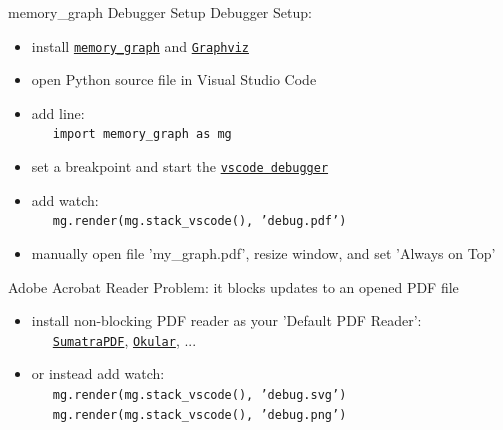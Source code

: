 \documentclass[10pt, colorlinks=true, urlcolor=blue]{beamer}
\begin{document}
\begin{frame}{memory\_graph Debugger Setup}
  \vspace{-1em}
  Debugger Setup:
  \begin{itemize}
  \item install \href{https://pypi.org/project/memory-graph/}{\texttt{memory\_graph}} and \href{https://graphviz.org/download/}{\texttt{Graphviz}}
  \item open Python source file in Visual Studio Code
  \item add line: \\ \ \ \ {\footnotesize \texttt{import memory_graph as mg}}
  \item set a breakpoint and start the \href{https://code.visualstudio.com/docs/python/debugging}{\texttt{vscode debugger}}
  \item add watch: \\ \ \ \ {\footnotesize \texttt{mg.render(mg.stack_vscode(), 'debug.pdf')}}
  \item manually open file 'my\_graph.pdf', resize window,  and set 'Always on Top'
  \end{itemize}
  
  \vspace{1.8em}
  
  Adobe Acrobat Reader Problem: it blocks updates to an opened PDF file
  \begin{itemize}
  \item install non-blocking PDF reader as your 'Default PDF Reader': \\ \ \ \
    \href{https://www.sumatrapdfreader.org/}{\texttt{SumatraPDF}},
    \href{https://okular.kde.org/}{\texttt{Okular}}, ...
  \item or instead add watch: \\
\ \ \ {\footnotesize \texttt{mg.render(mg.stack_vscode(), 'debug.svg')}} \\
\ \ \ {\footnotesize \texttt{mg.render(mg.stack_vscode(), 'debug.png')}}
  \end{itemize}
\end{frame}
\end{document}
